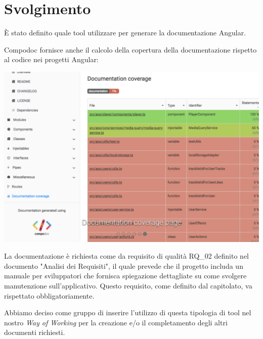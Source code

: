 \section{Svolgimento}

È stato definito quale tool utilizzare per generare la documentazione Angular.

Compodoc fornisce anche il calcolo della copertura della documentazione rispetto al codice nei progetti Angular:

\includegraphics[width = 0.9\linewidth]{img/compodoc.png}

La documentazione è richiesta come da requisito di qualità RQ_02 definito nel documento "Analisi dei Requisiti", il quale prevede che il progetto includa un manuale per sviluppatori che fornisca spiegazione dettagliate su come svolgere manutenzione sull'applicativo. Questo requisito, come definito dal capitolato, va rispettato obbligatoriamente.

Abbiamo deciso come gruppo di inserire l'utilizzo di questa tipologia di tool nel nostro {\it{Way of Working}} per la creazione e/o il completamento degli altri documenti richiesti.